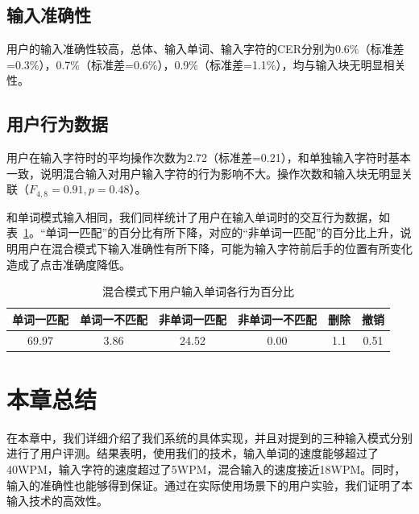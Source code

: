 \subsection{输入准确性}
用户的输入准确性较高，总体、输入单词、输入字符的CER分别为0.6\%（标准差=0.3\%），0.7\%（标准差=0.6\%），0.9\%（标准差=1.1\%），均与输入块无明显相关性。

\subsection{用户行为数据}
用户在输入字符时的平均操作次数为2.72（标准差=0.21），和单独输入字符时基本一致，说明混合输入对用户输入字符的行为影响不大。操作次数和输入块无明显关联（$F_{4,8}=0.91, p =0.48$）。

和单词模式输入相同，我们同样统计了用户在输入单词时的交互行为数据，如表~\ref{tab:hybrid-stat}。“单词一匹配”的百分比有所下降，对应的“非单词一匹配”的百分比上升，说明用户在混合模式下输入准确性有所下降，可能为输入字符前后手的位置有所变化造成了点击准确度降低。

\begin{table}[h]
  \centering
  \begin{minipage}[t]{0.9\linewidth} %
  \caption[混合模式下用户输入单词各行为百分比]{混合模式下用户输入单词各行为百分比}
  \label{tab:hybrid-stat}
    \centering
    \begin{tabularx}{\linewidth}{cccccc}
      \toprule[1.5pt]
      单词一匹配 & 单词一不匹配 & 非单词一匹配 & 非单词一不匹配 & 删除 & 撤销\\\midrule[1pt]
      69.97 & 3.86 & 24.52 & 0.00 & 1.1 & 0.51\\
      \bottomrule[1.5pt]
    \end{tabularx}
  \end{minipage}
\end{table}

\section{本章总结}
在本章中，我们详细介绍了我们系统的具体实现，并且对提到的三种输入模式分别进行了用户评测。结果表明，使用我们的技术，输入单词的速度能够超过了40WPM，输入字符的速度超过了5WPM，混合输入的速度接近18WPM。同时，输入的准确性也能够得到保证。通过在实际使用场景下的用户实验，我们证明了本输入技术的高效性。
